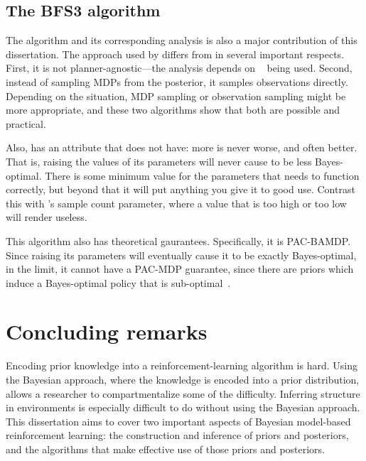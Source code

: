 \subsection{The BFS3 algorithm}

The  algorithm and its corresponding analysis is also a major contribution of this dissertation. The approach used by  differs from  in several important respects. First, it is not planner-agnostic---the analysis depends on ~\cite{walsh10} being used. Second, instead of sampling MDPs from the posterior, it samples observations directly. Depending on the situation, MDP sampling or observation sampling might be more appropriate, and these two algorithms show that both are possible and practical.

Also,  has an attribute that  does not have: more is never worse, and often better. That is, raising the values of its parameters will never cause  to be less Bayes-optimal. There is some minimum value for the parameters that  needs to function correctly, but beyond that it will put anything you give it to good use. Contrast this with 's sample count parameter, where a value that is too high or too low will render  useless.

This algorithm also has theoretical gaurantees. Specifically, it is PAC-BAMDP. Since raising its parameters will eventually cause it to be exactly Bayes-optimal, in the limit, it cannot have a PAC-MDP guarantee, since there are priors which induce a Bayes-optimal policy that is sub-optimal~.

\section{Concluding remarks}

Encoding prior knowledge into a reinforcement-learning algorithm is hard. Using the Bayesian approach, where the knowledge is encoded into a prior distribution, allows a researcher to compartmentalize some of the difficulty. Inferring structure in environments is especially difficult to do without using the Bayesian approach. This dissertation aims to cover two important aspects of Bayesian model-based reinforcement learning: the construction and inference of priors and posteriors, and the algorithms that make effective use of those priors and posteriors.

